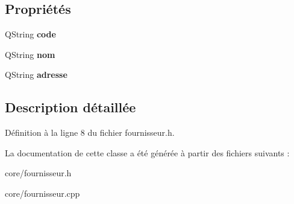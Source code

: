 \subsection*{Propriétés}
\begin{DoxyCompactItemize}
\item 
\hypertarget{class_core_1_1_fournisseur_a02dffbeb8baad2a751853224906eb368}{
QString {\bfseries code}}
\label{dd/d46/class_core_1_1_fournisseur_a02dffbeb8baad2a751853224906eb368}

\item 
\hypertarget{class_core_1_1_fournisseur_a13a6cff7c601b36e547fc753cfd96b9e}{
QString {\bfseries nom}}
\label{dd/d46/class_core_1_1_fournisseur_a13a6cff7c601b36e547fc753cfd96b9e}

\item 
\hypertarget{class_core_1_1_fournisseur_a6f897b77982a6b9fae7e76a04cf4ea9e}{
QString {\bfseries adresse}}
\label{dd/d46/class_core_1_1_fournisseur_a6f897b77982a6b9fae7e76a04cf4ea9e}

\end{DoxyCompactItemize}


\subsection{Description détaillée}


Définition à la ligne 8 du fichier fournisseur.h.



La documentation de cette classe a été générée à partir des fichiers suivants :\begin{DoxyCompactItemize}
\item 
core/fournisseur.h\item 
core/fournisseur.cpp\end{DoxyCompactItemize}
